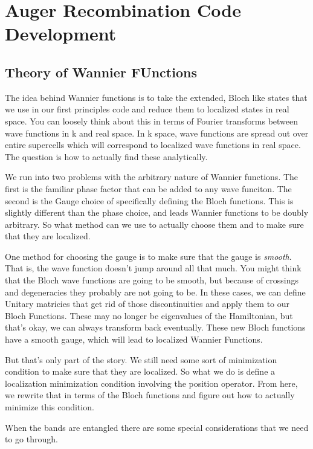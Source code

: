 \section{Auger Recombination Code
Development}\label{auger-recombination-code-development}

\subsection{Theory of Wannier
FUnctions}\label{theory-of-wannier-functions}

The idea behind Wannier functions is to take the extended, Bloch like
states that we use in our first principles code and reduce them to
localized states in real space. You can loosely think about this in
terms of Fourier transforms between wave functions in k and real space.
In k space, wave functions are spread out over entire supercells which
will correspond to localized wave functions in real space. The question
is how to actually find these analytically.

We run into two problems with the arbitrary nature of Wannier functions.
The first is the familiar phase factor that can be added to any wave
funciton. The second is the Gauge choice of specifically defining the
Bloch functions. This is slightly different than the phase choice, and
leads Wannier functions to be doubly arbitrary. So what method can we
use to actually choose them and to make sure that they are localized.

One method for choosing the gauge is to make sure that the gauge is
\emph{smooth}. That is, the wave function doesn't jump around all that
much. You might think that the Bloch wave functions are going to be
smooth, but because of crossings and degeneracies they probably are not
going to be. In these cases, we can define Unitary matricies that get
rid of those discontinuities and apply them to our Bloch Functions.
These may no longer be eigenvalues of the Hamiltonian, but that's okay,
we can always transform back eventually. These new Bloch functions have
a smooth gauge, which will lead to localized Wannier Functions.

But that's only part of the story. We still need some sort of
minimization condition to make sure that they are localized. So what we
do is define a localization minimization condition involving the
position operator. From here, we rewrite that in terms of the Bloch
functions and figure out how to actually minimize this condition.

When the bands are entangled there are some special considerations that
we need to go through.

